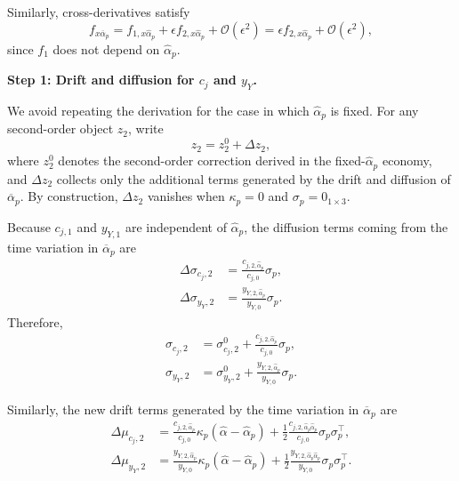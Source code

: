 Similarly, cross-derivatives satisfy
\begin{equation}
    f_{x\overline{\alpha}_p} = f_{1,x\hat{\alpha}_p} + \epsilon f_{2,x\hat{\alpha}_p} + \mathcal{O}(\epsilon^2) = \epsilon f_{2,x\hat{\alpha}_p} + \mathcal{O}(\epsilon^2),
\end{equation}
since $f_{1}$ does not depend on $\hat{\alpha}_p$.

\noindent\textbf{Step 1: Drift and diffusion for $c_j$ and $y_Y$.}

We avoid repeating the derivation for the case in which $\hat{\alpha}_p$ is fixed.
For any second-order object $z_2$, write
\begin{equation}
    z_2=z_2^{0}+\Delta z_2,
\end{equation}
where $z_2^{0}$ denotes the second-order correction derived in the fixed-$\hat{\alpha}_p$ economy, and $\Delta z_2$ collects only the additional terms generated by the drift and diffusion of $\overline{\alpha}_p$.
By construction, $\Delta z_2$ vanishes when $\kappa_p=0$ and $\sigma_p=0_{1\times 3}$.

Because $c_{j,1}$ and $y_{Y,1}$ are independent of $\hat{\alpha}_p$, the diffusion terms coming from the time variation in $\overline{\alpha}_p$ are
\begin{align}
    \Delta \sigma_{c_j,2}
    &= \frac{c_{j,2,\hat{\alpha}_p}}{c_{j,0}}\sigma_p,\\
    \Delta \sigma_{y_Y,2}
    &= \frac{y_{Y,2,\hat{\alpha}_p}}{y_{Y,0}}\sigma_p.
\end{align}
Therefore,
\begin{align}
    \sigma_{c_j,2} &= \sigma_{c_j,2}^{0}+\frac{c_{j,2,\hat{\alpha}_p}}{c_{j,0}}\sigma_p,\\
    \sigma_{y_Y,2} &= \sigma_{y_Y,2}^{0}+\frac{y_{Y,2,\hat{\alpha}_p}}{y_{Y,0}}\sigma_p.
\end{align}

Similarly, the new drift terms generated by the time variation in $\overline{\alpha}_p$ are
\begin{align}
    \Delta \mu_{c_j,2}
    &= \frac{c_{j,2,\hat{\alpha}_p}}{c_{j,0}}\kappa_p(\hat{\alpha}-\hat{\alpha}_p)
    +\frac{1}{2}\frac{c_{j,2,\hat{\alpha}_p\hat{\alpha}_p}}{c_{j,0}}\sigma_p\sigma_p^\top,\\
    \Delta \mu_{y_Y,2}
    &= \frac{y_{Y,2,\hat{\alpha}_p}}{y_{Y,0}}\kappa_p(\hat{\alpha}-\hat{\alpha}_p)
    +\frac{1}{2}\frac{y_{Y,2,\hat{\alpha}_p\hat{\alpha}_p}}{y_{Y,0}}\sigma_p\sigma_p^\top.
\end{align}

